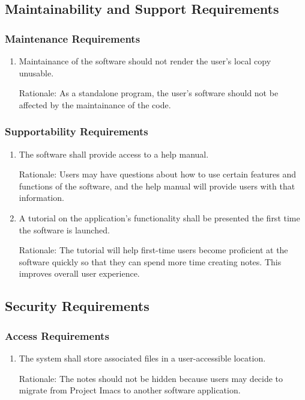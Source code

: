 \documentclass{article}
\begin{document}
\subsection{Maintainability and Support Requirements}
\subsubsection{Maintenance Requirements}
\begin{enumerate}[MR1]
    \item Maintainance of the software should not render the user's local copy unusable.

	Rationale: As a standalone program, the user's software should not be affected by the maintainance of the code.
\end{enumerate}

\subsubsection{Supportability Requirements}
\begin{enumerate}[SUR1]
    \item The software shall provide access to a help manual.

	Rationale: Users may have questions about how to use certain features and functions of the software, and the help manual will provide users with that information.
    \item A tutorial on the application's functionality shall be presented the first time the software is launched.

	Rationale: The tutorial will help first-time users become proficient at the software quickly so that they can spend more time creating notes. This improves overall user experience.
\end{enumerate}

\subsection{Security Requirements}
\subsubsection{Access Requirements}
\begin{enumerate}[{A}CR1]
    \item The system shall store associated files in a user-accessible location.

	Rationale: The notes should not be hidden because users may decide to migrate from Project Imacs to another software application.
\end{enumerate}
\end{document}
